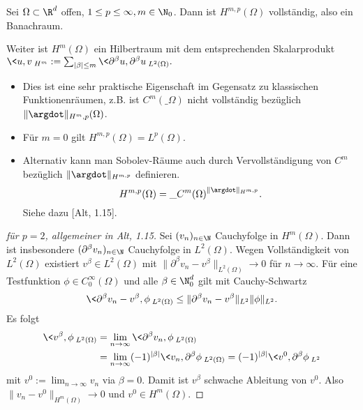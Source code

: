 \begin{st} \label{3.5}
	Sei $\Omega \subset \R^d$ offen, $1 \le p \le \infty, m \in \N_0$.
	Dann ist $H^{m,p}(\Omega)$ vollständig, also ein Banachraum.

	Weiter ist $H^m(\Omega)$ ein Hilbertraum mit dem entsprechenden Skalarprodukt
	\begin{math}
		\<u,v\>_{H^m} := \sum_{|\beta| \le m} \<\partial^\beta u, \partial^\beta u\>_{L^2(\Omega)}.
	\end{math}
	\begin{note}
		\begin{itemize}
			\item
				Dies ist eine sehr praktische Eigenschaft im Gegensatz zu klassischen Funktionenräumen, z.B. ist $C^m(\_\Omega)$ nicht vollständig bezüglich $\|\argdot\|_{H^m,p}(\Omega)$.
			\item
				Für $m = 0$ gilt $H^{m,p}(\Omega) = L^p(\Omega)$.
			\item
				Alternativ kann man Sobolev-Räume auch durch Vervollständigung von $C^m$ bezüglich $\|\argdot\|_{H^{m,p}}$ definieren.
				\[
					H^{m,p}(\Omega) = \_{C^m(\Omega)}^{\|\argdot\|_{H^{m,p}}}.
				\]
				Siehe dazu [Alt, 1.15].
		\end{itemize}
	\end{note}
	\begin{proof}[für $p=2$, allgemeiner in Alt, 1.15]
		Sei $(v_n)_{n\in\N}$ Cauchyfolge in $H^m(\Omega)$.
		Dann ist insbesondere $(\partial^\beta v_n)_{n\in\N}$ Cauchyfolge in $L^2(\Omega)$.
		Wegen Vollständigkeit von $L^2(\Omega)$ existiert $v^\beta \in L^2(\Omega)$ mit $\|\partial^\beta v_n - v^\beta\|_{L^2(\Omega)} \to 0$ für $n \to \infty$.
		Für eine Testfunktion $\phi \in C_0^\infty(\Omega)$ und alle $\beta \in \N_0^d$ gilt mit Cauchy-Schwartz
		\begin{align*}
			\<\partial^\beta v_n - v^\beta, \phi\>_{L^2(\Omega)}
			\le \|\partial^\beta v_n - v^\beta\|_{L^2}\|\phi\|_{L^2}.
		\end{align*}
		Es folgt
		\begin{align*}
			\<v^\beta, \phi\>_{L^2(\Omega)}
			&= \lim_{n\to\infty} \<\partial^\beta v_n, \phi\>_{L^2(\Omega)} \\
			&= \lim_{n\to\infty} (-1)^{|\beta|} \<v_n, \partial^\beta \phi\>_{L^2(\Omega)}
			= (-1)^{|\beta|} \<v^0, \partial^\beta \phi\>_{L^2}
		\end{align*}
		mit $v^0 := \lim_{n\to\infty} v_n$ via $\beta = 0$.
		Damit ist $v^\beta$ schwache Ableitung von $v^0$.
		Also $\|v_n - v^0\|_{H^m(\Omega)} \to 0$ und $v^0 \in H^m(\Omega)$.
	\end{proof}
\end{st}

